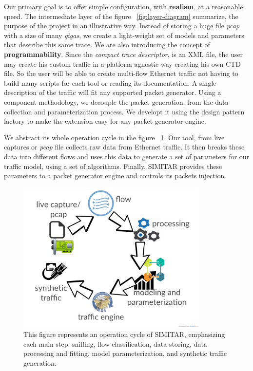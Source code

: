 Our primary goal is to offer simple configuration, with \textbf{realism}, at a reasonable speed. The intermediate layer of the figure ~\ref{fig:layer-diagram} summarize, the purpose of the project in an illustrative way. Instead of storing a huge file \textit{pcap} with a size of many \textit{gigas}, we create a light-weight set of models and parameters that describe this same trace. We are also introducing the concept of \textbf{programmability}. Since the \textit{compact trace descriptor},  is an XML file, the user may create his custom traffic in a platform agnostic way creating his own CTD file. So the user will be able to create multi-flow Ethernet traffic not having to build many scripts for each tool or reading its documentation. A single description of the traffic will fit any supported packet generator. Using a component methodology, we decouple the packet generation, from the data collection and parameterization process. We developt it using the design pattern factory to make the extension easy for any packet generator engine. 


We abstract its whole operation cycle in the figure ~\ref{fig:cycle-of-operation}. Our tool, from live captures or \textit{pcap} file collects raw data from Ethernet traffic. It then breaks these data into different flows and uses this data to generate a set of parameters for our traffic model, using a set of algorithms. Finally, SIMITAR provides these parameters to a packet generator engine and controls its packets injection.

\begin{figure}[ht!]
        \centering
        \includegraphics[height=3.0in]{figures/ch3/digram-project-cycle}
        \caption{This figure represents an operation cycle of SIMITAR, emphasizing each main step: sniffing, flow classification, data storing, data processing and fitting, model parameterization,  and synthetic traffic generation.}
    \label{fig:cycle-of-operation}
\end{figure}


